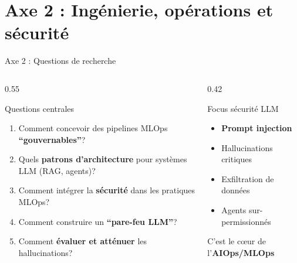 \documentclass[aspectratio=169,11pt]{beamer}
\begin{document}
\section{Axe 2 : Ingénierie, opérations et sécurité}

\begin{frame}{Axe 2 : Questions de recherche}
  \begin{columns}[T]
    \begin{column}{0.55\textwidth}
      \begin{block}{Questions centrales}
        \begin{enumerate}\small
          \item Comment concevoir des pipelines MLOps \textbf{``gouvernables''}?
          \item Quels \textbf{patrons d'architecture} pour systèmes LLM (RAG, agents)?
          \item Comment intégrer la \textbf{sécurité} dans les pratiques MLOps?
          \item Comment construire un \textbf{``pare-feu LLM''}?
          \item Comment \textbf{évaluer et atténuer} les hallucinations?
        \end{enumerate}
      \end{block}
    \end{column}
    \begin{column}{0.42\textwidth}
      \begin{alertblock}{Focus sécurité LLM}
        \begin{itemize}\small
          \item \textbf{Prompt injection}
          \item Hallucinations critiques
          \item Exfiltration de données
          \item Agents sur-permissionnés
        \end{itemize}
      \end{alertblock}
      
      \vspace{0.3em}
      
      {\small\textcolor{axe2color}{C'est le cœur de l'\textbf{AIOps/MLOps}}}
    \end{column}
  \end{columns}
\end{frame}
\end{document}
